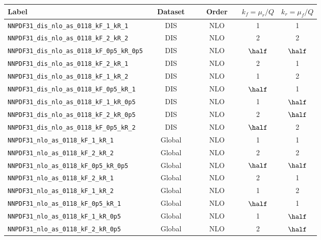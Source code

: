 \begin{table}[t]
  \centering
\footnotesize
  \renewcommand*{\arraystretch}{1.25}
  \begin{tabular}{lcccc}
    Label                   & $\quad$Dataset$\quad$  & $\quad$Order$\quad$  &
    $k_f=\mu_r/Q$
    & $k_r=\mu_f/Q$  \\
 \toprule   
     {\tt NNPDF31\_dis\_nlo\_as\_0118\_kF\_1\_kR\_1}  & DIS  & NLO  &  1  &  1  \\
     {\tt NNPDF31\_dis\_nlo\_as\_0118\_kF\_2\_kR\_2}   & DIS  & NLO  &  2  &  2  \\
     {\tt NNPDF31\_dis\_nlo\_as\_0118\_kF\_0p5\_kR\_0p5}   & DIS  & NLO  &  $\half$  &  $\half$  \\
     {\tt NNPDF31\_dis\_nlo\_as\_0118\_kF\_2\_kR\_1}    & DIS  & NLO  &  2  &  1  \\
     {\tt NNPDF31\_dis\_nlo\_as\_0118\_kF\_1\_kR\_2}  & DIS  & NLO  &  1  &  2  \\
     {\tt NNPDF31\_dis\_nlo\_as\_0118\_kF\_0p5\_kR\_1}  & DIS  & NLO  &  $\half$  &  1  \\
     {\tt NNPDF31\_dis\_nlo\_as\_0118\_kF\_1\_kR\_0p5}   & DIS  & NLO  &  1  &  $\half$ \\
     {\tt NNPDF31\_dis\_nlo\_as\_0118\_kF\_2\_kR\_0p5}   & DIS  & NLO  &  2  &  $\half$  \\
     {\tt NNPDF31\_dis\_nlo\_as\_0118\_kF\_0p5\_kR\_2}  & DIS  & NLO  &  $\half$  &  2  \\
     \midrule
    {\tt NNPDF31\_nlo\_as\_0118\_kF\_1\_kR\_1}  & Global  & NLO  &  1  &  1  \\
    {\tt NNPDF31\_nlo\_as\_0118\_kF\_2\_kR\_2}      & Global  & NLO  &  2  &  2  \\
     {\tt NNPDF31\_nlo\_as\_0118\_kF\_0p5\_kR\_0p5}   & Global  & NLO  &  $\half$  &  $\half$  \\
     {\tt NNPDF31\_nlo\_as\_0118\_kF\_2\_kR\_1}    & Global  & NLO  &  2  &  1  \\
     {\tt NNPDF31\_nlo\_as\_0118\_kF\_1\_kR\_2}    & Global  & NLO  &  1  &  2  \\
     {\tt NNPDF31\_nlo\_as\_0118\_kF\_0p5\_kR\_1}    & Global  & NLO  &  $\half$  &  1  \\
     {\tt NNPDF31\_nlo\_as\_0118\_kF\_1\_kR\_0p5}      & Global  & NLO  &  1  &  $\half$ \\
     {\tt NNPDF31\_nlo\_as\_0118\_kF\_2\_kR\_0p5}      & Global  & NLO  &  2  &  $\half$  \\

\end{tabular}
\end{table}
